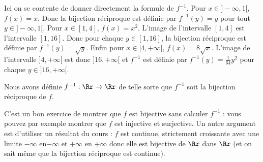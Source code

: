 {\begin{enumerate}
{Ici on se contente de donner directement la formule de $f^{-1}$. 
Pour $x \in  ]-\infty,1[$, $f(x)=x$. Donc la bijection réciproque est définie par $f^{-1}(y)=y$ pour tout $y \in  ]-\infty,1[$.
Pour $x \in [1,4]$, $f(x)=x^2$. L'image de l'intervalle $[1,4]$ est l'intervalle $[1,16]$. Donc pour chaque $y \in [1,16]$,
la bijection réciproque est définie par $f^{-1}(y) = \sqrt y$. 
Enfin pour $x\in]4,+\infty[$, $f(x) = 8\sqrt x$. L'image de l'intervalle $]4,+\infty[$ est donc $]16,+\infty[$
et $f^{-1}$ est définie par $f^{-1}(y) = \frac{1}{64} y^2$ pour chaque $y \in ]16,+\infty[$.

Nous avons définie $f^{-1} : \Rr \to \Rr$ de telle sorte que $f^{-1}$ soit la bijection réciproque de $f$.

\bigskip

C'est un bon exercice de montrer que $f$ est bijective sans calculer $f^{-1}$ :
vous pouvez par exemple montrer que $f$ est injective et surjective.
Un autre argument est d'utiliser un résultat du cours : $f$ est continue, strictement croissante avec une limite $-\infty$ en$-\infty$
et $+\infty$ en $+\infty$ donc elle est bijective de $\Rr$ dans $\Rr$ (et on sait même que la bijection réciproque est continue).}
\end{enumerate}
}